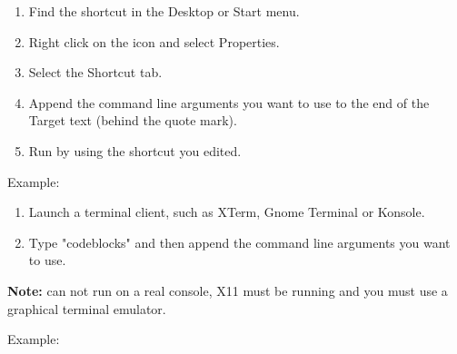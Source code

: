 \begin{enumerate}[noitemsep] 
\item Find the \codeblocks shortcut in the Desktop or Start menu.
\item Right click on the icon and select Properties.
\item Select the Shortcut tab.
\item Append the command line arguments you want to use to the end of the Target text (behind the quote mark).
\item Run \codeblocks by using the shortcut you edited.
\end{enumerate}

Example:\\

\begin{enumerate}[noitemsep]
\item Launch a terminal client, such as XTerm, Gnome Terminal or Konsole.
\item Type "codeblocks" and then append the command line arguments you want to use.
\end{enumerate}
\textbf{Note:} \codeblocks can not run on a real console, X11 must be running and you must use a graphical terminal emulator.

Example:\\


\iftrue    %
\newpage
